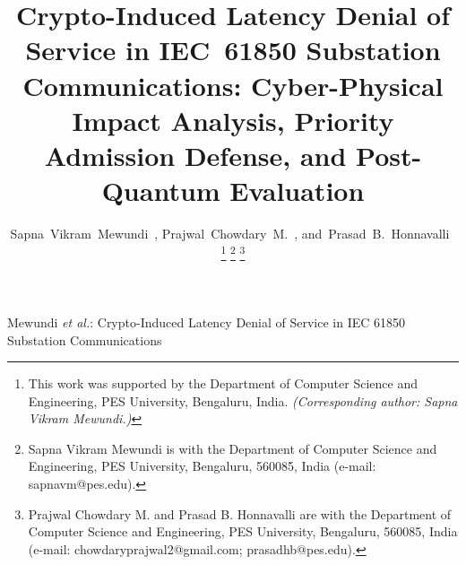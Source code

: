 \documentclass[journal]{IEEEtran}
\begin{document}
\title{Crypto-Induced Latency Denial of Service in IEC~61850 Substation Communications: Cyber-Physical Impact Analysis, Priority Admission Defense, and Post-Quantum Evaluation}

\author{Sapna~Vikram~Mewundi~,
        Prajwal~Chowdary~M.~,
        and~Prasad~B.~Honnavalli~%
\thanks{This work was supported by the Department of Computer Science and Engineering, PES University, Bengaluru, India. \textit{(Corresponding author: Sapna Vikram Mewundi.)}}%
\thanks{Sapna Vikram Mewundi is with the Department of Computer Science and Engineering, PES University, Bengaluru, 560085, India (e-mail: sapnavm@pes.edu).}%
\thanks{Prajwal Chowdary M. and Prasad B. Honnavalli are with the Department of Computer Science and Engineering, PES University, Bengaluru, 560085, India (e-mail: chowdaryprajwal2@gmail.com; prasadhb@pes.edu).}%
}

%
{Mewundi \MakeLowercase{\textit{et al.}}: Crypto-Induced Latency Denial of Service in IEC 61850 Substation Communications}

\maketitle
\end{document}
